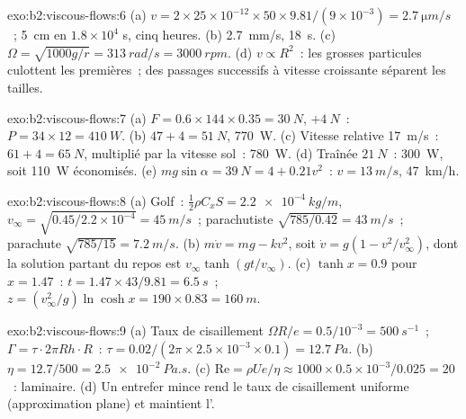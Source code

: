 \begin{solution}{exo:b2:viscous-flows:6}
(a) $v = 2 \times 25 \times 10^{-12} \times 50 \times 9.81/(9 \times 10^{-3}) = \qty{2.7}{\micro m/s}$~;
\qty{5}{cm} en $1.8 \times 10^4$ s, cinq heures. (b) \qty{2.7}{mm/s}, \qty{18}{s}. (c)
$\Omega = \sqrt{1000g/r} = \qty{313}{rad/s} = \qty{3000}{rpm}$. (d) $v \propto R^2$~: les grosses
particules culottent les premières~; des passages successifs à vitesse croissante séparent
les tailles.
\end{solution}

\begin{solution}{exo:b2:viscous-flows:7}
(a) $F = 0.6 \times 144 \times 0.35 = \qty{30}{N}$, $+\qty{4}{N}$~: $P = 34 \times 12 =
\qty{410}{W}$. (b) $47 + 4 = \qty{51}{N}$, \qty{770}{W}. (c) Vitesse relative
\qty{17}{m/s}~: $61 + 4 = \qty{65}{N}$, multiplié par la vitesse sol~: \qty{780}{W}. (d)
Traînée $\qty{21}{N}$~: \qty{300}{W}, soit \qty{110}{W} économisés. (e) $mg\sin\alpha = \qty{39}{N} =
4 + 0.21v^2$~: $v = \qty{13}{m/s}$, \qty{47}{km/h}.
\end{solution}

\begin{solution}{exo:b2:viscous-flows:8}
(a) Golf~: $\tfrac12\rho C_xS = \qty{2.2e-4}{kg/m}$, $v_\infty = \sqrt{0.45/2.2 \times 10^{-4}}
= \qty{45}{m/s}$~; parachutiste $\sqrt{785/0.42} = \qty{43}{m/s}$~; parachute $\sqrt{785/15} =
\qty{7.2}{m/s}$. (b) $m\dot v = mg - kv^2$, soit $\dot v = g(1 - v^2/v_\infty^2)$,
dont la solution partant du repos est $v_\infty\tanh(gt/v_\infty)$. (c) $\tanh x = 0.9$ pour
$x = 1.47$~: $t = 1.47 \times 43/9.81 = \qty{6.5}{s}$~; $z = (v_\infty^2/g)\ln\cosh x =
190 \times 0.83 = \qty{160}{m}$.
\end{solution}

\begin{solution}{exo:b2:viscous-flows:9}
(a) Taux de cisaillement $\Omega R/e = 0.5/10^{-3} = \qty{500}{s^{-1}}$~; $\Gamma = \tau\cdot2\pi Rh
\cdot R$~: $\tau = 0.02/(2\pi \times 2.5 \times 10^{-3} \times 0.1) = \qty{12.7}{Pa}$. (b) $\eta
= 12.7/500 = \qty{2.5e-2}{Pa.s}$. (c) $\mathrm{Re} = \rho Ue/\eta \approx 1000 \times 0.5 \times
10^{-3}/0.025 = 20$~: laminaire. (d) Un entrefer mince rend le taux de cisaillement uniforme
(approximation plane) et maintient l'.
\end{solution}

